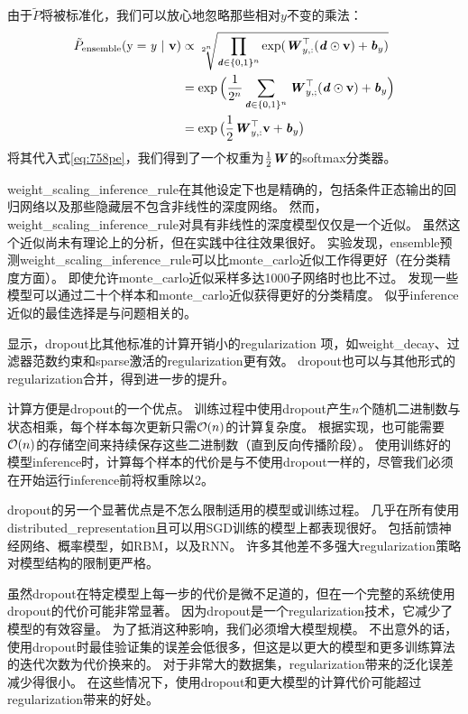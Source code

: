 由于$\tilde P$将被标准化，我们可以放心地忽略那些相对$y$不变的乘法：
\begin{align}
\tilde{P}_{\text{ensemble}}(\mathrm{y}=\mathit{y} ~|~ \mathbf{v}) &\propto 
\sqrt[2^n]{\prod_{\boldsymbol{\mathit{d}} \in \{0,1\}^n} \exp (\boldsymbol{\mathit{W}}_{y,:}^\top(\boldsymbol{\mathit{d}} \odot \mathbf{v}) + \boldsymbol{\mathit{b}}_y)} \\
& = \exp \Big(\frac{1}{2^n} \sum_{\boldsymbol{\mathit{d}} \in \{0,1\}^n} \boldsymbol{\mathit{W}}_{y,;}^\top(\boldsymbol{\mathit{d}} \odot \mathbf{v}) + \boldsymbol{\mathit{b}}_y \Big) \\
& = \exp \big(\frac{1}{2}\boldsymbol{\mathit{W}}_{y,:}^\top \mathbf{v} + \boldsymbol{\mathit{b}}_y \big) 
\end{align}
将其代入式\ref{eq:758pe}，我们得到了一个权重为$\frac{1}{2}\boldsymbol{\mathit{W}}$的\gls{softmax}分类器。


\gls{weight_scaling_inference_rule}在其他设定下也是精确的，包括条件正态输出的回归网络以及那些隐藏层不包含非线性的深度网络。
然而，\gls{weight_scaling_inference_rule}对具有非线性的深度模型仅仅是一个近似。
虽然这个近似尚未有理论上的分析，但在实践中往往效果很好。
\cite{Goodfellow-et-al-ICML2013}实验发现，\gls{ensemble}预测\gls{weight_scaling_inference_rule}可以比\gls{monte_carlo}近似工作得更好（在分类精度方面）。
即使允许\gls{monte_carlo}近似采样多达1000子网络时也比不过。
\cite{gal2015bayesian}发现一些模型可以通过二十个样本和\gls{monte_carlo}近似获得更好的分类精度。
似乎\gls{inference}近似的最佳选择是与问题相关的。

\cite{Srivastava14}显示，\gls{dropout}比其他标准的计算开销小的\gls{regularization} 项，如\gls{weight_decay}、过滤器范数约束和\gls{sparse}激活的\gls{regularization}更有效。
\gls{dropout}也可以与其他形式的\gls{regularization}合并，得到进一步的提升。

计算方便是\gls{dropout}的一个优点。
训练过程中使用\gls{dropout}产生$n$个随机二进制数与状态相乘，每个样本每次更新只需$\mathcal{O}(n)$的计算复杂度。
根据实现，也可能需要$\mathcal{O}(n)$的存储空间来持续保存这些二进制数（直到反向传播阶段）。
使用训练好的模型\gls{inference}时，计算每个样本的代价是与不使用\gls{dropout}一样的，尽管我们必须在开始运行\gls{inference}前将权重除以2。


\gls{dropout}的另一个显著优点是不怎么限制适用的模型或训练过程。
几乎在所有使用\gls{distributed_representation}且可以用\gls{SGD}训练的模型上都表现很好。
包括前馈神经网络、概率模型，如\gls{RBM}\citep{Srivastava14}，以及\gls{RNN}\citep{Bayer-et-al-arXiv-2014,Pascanu-et-al-ICLR2014}。
许多其他差不多强大\gls{regularization}策略对模型结构的限制更严格。

虽然\gls{dropout}在特定模型上每一步的代价是微不足道的，但在一个完整的系统使用\gls{dropout}的代价可能非常显著。
因为\gls{dropout}是一个\gls{regularization}技术，它减少了模型的有效容量。
为了抵消这种影响，我们必须增大模型规模。
不出意外的话，使用\gls{dropout}时最佳验证集的误差会低很多，但这是以更大的模型和更多训练算法的迭代次数为代价换来的。
对于非常大的数据集，\gls{regularization}带来的泛化误差减少得很小。
在这些情况下，使用\gls{dropout}和更大模型的计算代价可能超过\gls{regularization}带来的好处。

